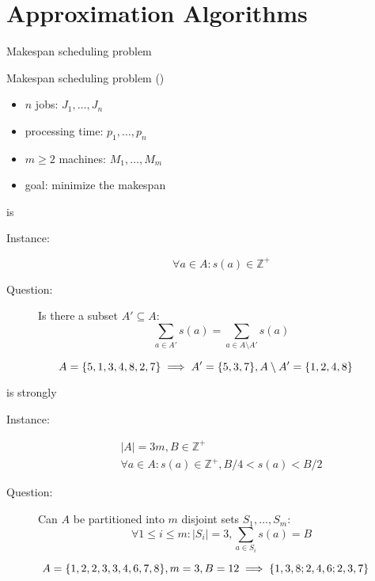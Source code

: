 \section{Approximation Algorithms}


\begin{frame}{Makespan scheduling problem}
  \begin{exampleblock}{Makespan scheduling problem (\ms{})}
	\begin{itemize}
	  \item $n$ jobs: $J_1, \dots, J_n$
	  \item processing time: $p_1, \dots, p_n$
	  \item $m \ge 2$ machines: $M_1, \dots, M_m$
	 ­\item goal: minimize the makespan
	\end{itemize}
  \end{exampleblock}
\end{frame}
\begin{frame}{\ms{} is \npc{}}
  \begin{definition}[Partition]
	\begin{description}
	  \item[Instance:] 
		\[
		  \forall a \in A: s(a) \in \mathbb{Z}^{+} 
		\]
	  \item[Question:] Is there a subset $A' \subseteq A$: 
		\[
		  \sum_{a \in A'} s(a) = \sum_{a \in A \setminus A'} s(a)
		\]
	\end{description}
  \end{definition}

  \[
	A = \{5,1,3,4,8,2,7\} \implies A' = \{5,3,7\}, A \setminus A' = \{1,2,4,8\}
  \]
\end{frame}
\begin{frame}{\ms{} is strongly \npc{}}
  \begin{definition}[$3$-Partition]
	\begin{description}
	  \item[Instance:] 
		\begin{gather*}
		  |A| = 3m, B \in \mathbb{Z}^{+} \\
		  \forall a \in A: s(a) \in \mathbb{Z}^{+}, B/4 < s(a) < B/2
		\end{gather*}
	  \item[Question:] Can $A$ be partitioned into $m$ disjoint sets $S_1,\dots,S_m$:
		\[
		  \forall 1 \le i \le m: |S_i| = 3, \sum_{a \in S_i} s(a) = B
		\]
	\end{description}
  \end{definition}

  \[
	A = \{1,2,2,3,3,4,6,7,8\}, m = 3, B = 12 \implies \{1,3,8; 2,4,6; 2,3,7\}
  \]
\end{frame}
